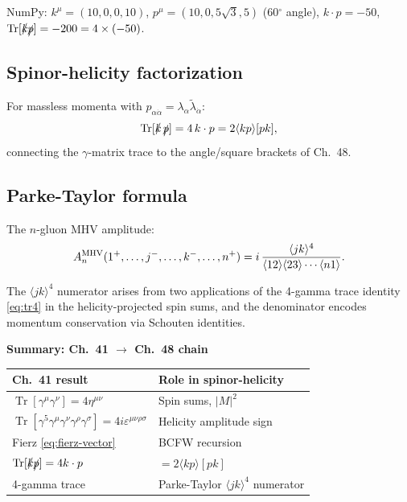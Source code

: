 \documentclass[12pt]{article}
\newcommand{\verified}[1]{\textcolor{verifygreen}{\checkmark\; #1}}
\DeclareMathOperator\Tr{Tr}
\begin{document}
\begin{mdframed}[backgroundcolor=green!5]
\verified{NumPy:}
$k^\mu=(10,0,0,10)$, $p^\mu=(10,0,5\sqrt{3},5)$ (60${}^\circ$ angle),
$k\cdot p = -50$, $\Tr[\slashed{k}\slashed{p}] = -200 = 4\times(-50)$. \checkmark
\end{mdframed}

\subsection{Spinor-helicity factorization}

For massless momenta with $p_{\alpha\dot\alpha}=\lambda_\alpha\tilde\lambda_{\dot\alpha}$:
\begin{equation}
  \Tr[\slashed{k}\,\slashed{p}] = 4\,k\cdot p = 2\langle kp\rangle[pk],
\end{equation}
connecting the $\gamma$-matrix trace to the angle/square brackets of Ch.~48.

\subsection{Parke-Taylor formula}

The $n$-gluon MHV amplitude:
\begin{equation}\label{eq:parke-taylor}
  A_n^{\rm MHV}(1^+,\ldots,j^-,\ldots,k^-,\ldots,n^+)
  = i\,\frac{\langle jk\rangle^4}{\langle12\rangle\langle23\rangle\cdots\langle n1\rangle}.
\end{equation}

The $\langle jk\rangle^4$ numerator arises from two applications of the
4-gamma trace identity \eqref{eq:tr4} in the helicity-projected spin sums,
and the denominator encodes momentum conservation via Schouten identities.

\begin{mdframed}[backgroundcolor=blue!5]
\textbf{Summary: Ch.~41 $\to$ Ch.~48 chain}
\begin{center}
\begin{tabular}{ll}
\toprule
Ch.~41 result & Role in spinor-helicity \\
\midrule
$\Tr[\gamma^\mu\gamma^\nu]=4\eta^{\mu\nu}$ & Spin sums, $|M|^2$ \\
$\Tr[\gamma^5\gamma^\mu\gamma^\nu\gamma^\rho\gamma^\sigma]=4i\varepsilon^{\mu\nu\rho\sigma}$ & Helicity amplitude sign \\
Fierz \eqref{eq:fierz-vector} & BCFW recursion \\
$\Tr[\slashed{k}\slashed{p}]=4k\cdot p$ & $= 2\langle kp\rangle[pk]$ \\
4-gamma trace & Parke-Taylor $\langle jk\rangle^4$ numerator \\
\bottomrule
\end{tabular}
\end{center}
\end{mdframed}

\vfill

\end{document}
